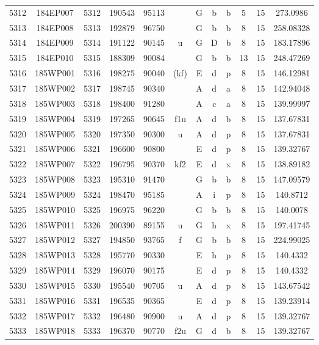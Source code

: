 \begin{tabular}{|*{12}{c|}}
5312 & 184EP007 & 5312 & 190543 & 95113 &  & G & b & b & 5 & 15 & 273.0986 \\ 
5313 & 184EP008 & 5313 & 192879 & 96750 &  & G & b & b & 8 & 15 & 258.08328 \\ 
5314 & 184EP009 & 5314 & 191122 & 90145 & u & G & D & b & 8 & 15 & 183.17896 \\ 
5315 & 184EP010 & 5315 & 188309 & 90084 &  & G & b & b & 13 & 15 & 248.47269 \\ 
5316 & 185WP001 & 5316 & 198275 & 90040 & (kf) & E & d & p & 8 & 15 & 146.12981 \\ 
5317 & 185WP002 & 5317 & 198745 & 90340 &  & A & d & a & 8 & 15 & 142.94048 \\ 
5318 & 185WP003 & 5318 & 198400 & 91280 &  & A & c & a & 8 & 15 & 139.99997 \\ 
5319 & 185WP004 & 5319 & 197265 & 90645 & f1u & A & d & b & 8 & 15 & 137.67831 \\ 
5320 & 185WP005 & 5320 & 197350 & 90300 & u & A & d & p & 8 & 15 & 137.67831 \\ 
5321 & 185WP006 & 5321 & 196600 & 90800 &  & E & d & p & 8 & 15 & 139.32767 \\ 
5322 & 185WP007 & 5322 & 196795 & 90370 & kf2 & E & d & x & 8 & 15 & 138.89182 \\ 
5323 & 185WP008 & 5323 & 195310 & 91470 &  & G & b & b & 8 & 15 & 147.09579 \\ 
5324 & 185WP009 & 5324 & 198470 & 95185 &  & A & i & p & 8 & 15 & 140.8712 \\ 
5325 & 185WP010 & 5325 & 196975 & 96220 &  & G & b & b & 8 & 15 & 140.0078 \\ 
5326 & 185WP011 & 5326 & 200390 & 89155 & u & G & h & x & 8 & 15 & 197.41745 \\ 
5327 & 185WP012 & 5327 & 194850 & 93765 & f & G & b & b & 8 & 15 & 224.99025 \\ 
5328 & 185WP013 & 5328 & 195770 & 90330 &  & E & h & p & 8 & 15 & 140.4332 \\ 
5329 & 185WP014 & 5329 & 196070 & 90175 &  & E & d & p & 8 & 15 & 140.4332 \\ 
5330 & 185WP015 & 5330 & 195540 & 90705 & u & A & d & p & 8 & 15 & 143.67542 \\ 
5331 & 185WP016 & 5331 & 196535 & 90365 &  & E & d & p & 8 & 15 & 139.23914 \\ 
5332 & 185WP017 & 5332 & 196480 & 90900 & u & A & d & p & 8 & 15 & 139.32767 \\ 
5333 & 185WP018 & 5333 & 196370 & 90770 & f2u & G & d & b & 8 & 15 & 139.32767 \\ 

\end{tabular}
